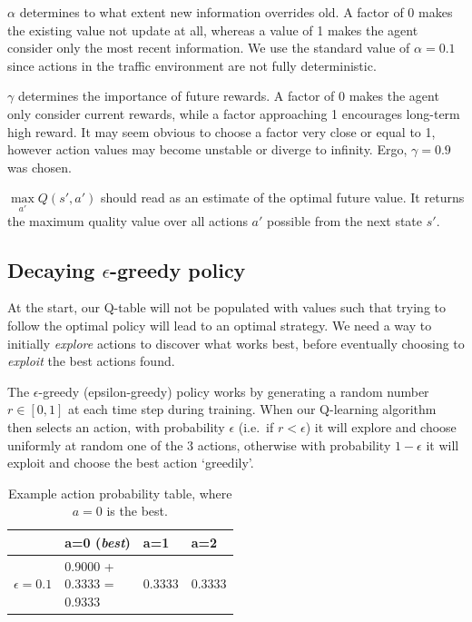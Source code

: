 \documentclass[a4paper]{report}
\begin{document}
$\alpha$ determines to what extent new information overrides old. A factor of 0 makes the existing value not update at all, whereas a value of 1 makes the agent consider only the most recent information. We use the standard value of $\alpha=0.1$ since actions in the traffic environment are not fully deterministic.

$\gamma$ determines the importance of future rewards. A factor of 0 makes the agent only consider current rewards, while a factor approaching 1 encourages long-term high reward. It may seem obvious to choose a factor very close or equal to 1, however action values may become unstable or diverge to infinity. Ergo, $\gamma=0.9$ was chosen.

$\underset{a'}{\max} Q(s',a')$ should read as an estimate of the optimal future value. It returns the maximum quality value over all actions $a'$ possible from the next state $s'$.

\subsection{Decaying $\epsilon$-greedy policy}

At the start, our Q-table will not be populated with values such that trying to follow the optimal policy will lead to an optimal strategy. We need a way to initially \emph{explore} actions to discover what works best, before eventually choosing to \emph{exploit} the best actions found.

The $\epsilon$-greedy (epsilon-greedy) policy works by generating a random number $r\in[0,1]$ at each time step during training. When our Q-learning algorithm then selects an action, with probability $\epsilon$ (i.e.\ if $r < \epsilon$) it will explore and choose uniformly at random one of the 3 actions, otherwise with probability $1-\epsilon$ it will exploit and choose the best action `greedily'.

\begin{table}[H]
  \centering
  \begin{tabular}{c | l l l}
    \textbf{} & a=0 (\emph{best}) & a=1 & a=2 \\
    \hline
    $\epsilon=0.1$ & \makecell[l]{0.9000 +\\0.3333 =\\0.9333} & 0.3333 & 0.3333 \\
  \end{tabular}
  \caption{Example action probability table, where $a=0$ is the best.}
  \label{tab:action_probabilities}
\end{table}
\end{document}
